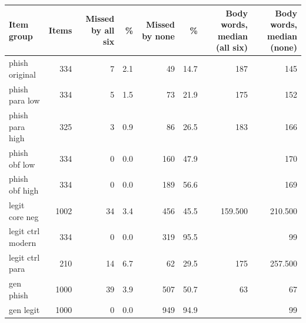 \begin{tabular}{lrrrrrrr}
\toprule
Item group & Items & Missed by all six & \% & Missed by none & \% & Body words, median (all six) & Body words, median (none) \\
\midrule
phish original & 334 & 7 & 2.1 & 49 & 14.7 & 187 & 145 \\
phish para low & 334 & 5 & 1.5 & 73 & 21.9 & 175 & 152 \\
phish para high & 325 & 3 & 0.9 & 86 & 26.5 & 183 & 166 \\
phish obf low & 334 & 0 & 0.0 & 160 & 47.9 &  & 170 \\
phish obf high & 334 & 0 & 0.0 & 189 & 56.6 &  & 169 \\
legit core neg & 1002 & 34 & 3.4 & 456 & 45.5 & 159.500 & 210.500 \\
legit ctrl modern & 334 & 0 & 0.0 & 319 & 95.5 &  & 99 \\
legit ctrl para & 210 & 14 & 6.7 & 62 & 29.5 & 175 & 257.500 \\
gen phish & 1000 & 39 & 3.9 & 507 & 50.7 & 63 & 67 \\
gen legit & 1000 & 0 & 0.0 & 949 & 94.9 &  & 99 \\
\bottomrule
\end{tabular}
